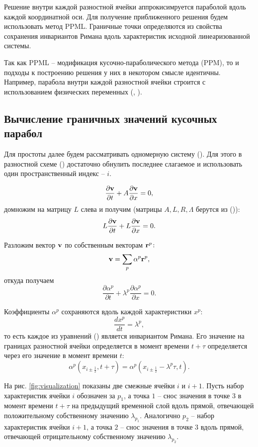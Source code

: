 \documentclass[12pt,a4paper]{article}
\newcommand{\picref}[1]{рис. \ref{#1}}
\newcommand{\half}{\frac{1}{2}}
\newcommand{\dpartial}[2]{\dfrac{ \partial #1 }{ \partial #2 }}
\begin{document}
    Решение внутри каждой разностной ячейки аппрокисимруется параболой вдоль каждой координатной оси. Для получение приближенного решения будем использовать метод PPML. Граничные точки определяются из свойства сохранения инвариантов Римана вдоль характеристик исходной линеаризованной системы.

    Так как PPML -- модификация кусочно-параболического метода (PPM), то и подходы к построению решения у них в некотором смысле идентичны. Например, парабола внутри каждой разностной ячейки строится с использованием физических переменных (, ).

    \subsection{Вычисление граничных значений кусочных парабол}

    Для простоты далее будем рассматривать одномерную систему (). Для этого в разностной схеме () достаточно обнулить последнее слагаемое и использовать один пространственный индекс -- $ i $. 

    \[
        \dpartial{\bold v}{t} + A\dpartial{\bold v}{x} = 0,  
    \]
    \noindent домножим на матрицу $L$ слева и получим (матрицы $A, L, R, \Lambda$ берутся из ()):
    \[
        L\dpartial{\bold v}{t} + \Lambda L \dpartial{\bold v}{x} = 0.
    \]

    Разложим вектор $ \bold v $ по собственным векторам $ \bold r^p \colon$
    \[
        \bold v = \sum_p \alpha^p \bold r^p,
    \]
    \noindent откуда получаем
    \begin{equation}
        \label{system:eigen}
        \dpartial{\alpha^p}{t} + \lambda^p \dpartial{\alpha^p}{x} = 0.  
    \end{equation}

    Коэффициенты $ \alpha^p $ сохраняются вдоль каждой характеристики $ x^p \colon$
    \[
        \dfrac{d x^p}{dt} = \lambda^p,  
    \]
    \noindent то есть каждое из уравнений () является инвариантом Римана. Его значение на границах разностной ячейки определяется в момент времени $t + \tau$ определяется через его значение в момент времени $t\colon$
    \begin{equation}
        \alpha^p(x_{i \pm \half}, t + \tau) = \alpha^p(x_{i \pm \half} - \lambda^p \tau, t).
    \end{equation}

    На \picref{fig:visualization} показаны две смежные ячейки $i$ и $i + 1$. Пусть набор характеристик ячейки $ i $ обозначен за $p_1$, а точка $1$ -- снос значения в точке $3$ в момент времени $ t + \tau $ на предыдущий временной слой вдоль прямой, отвечающей положительному собственному значению $ \lambda_{p_1} $. Аналогично $p_2$ -- набор характеристик ячейки $i + 1$, а точка $2$ -- снос значения в точке $3$ вдоль прямой, отвечающей отрицательному собственному значению $ \lambda_{p_2} $.
\end{document}
